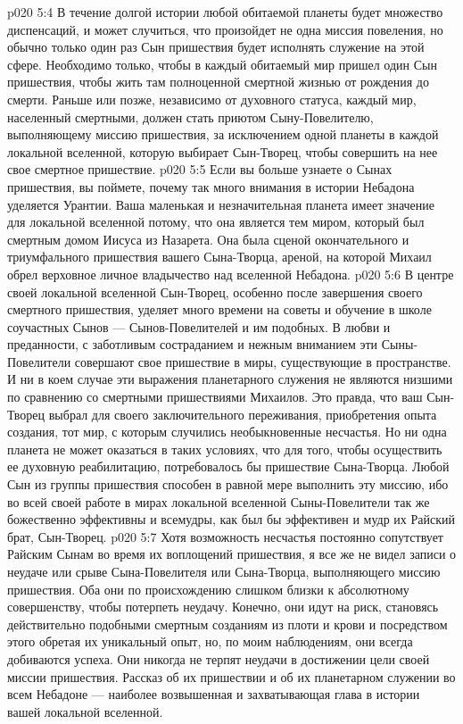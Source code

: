 \vs p020 5:4 В течение долгой истории любой обитаемой планеты будет множество диспенсаций, и может случиться, что произойдет не одна миссия повеления, но обычно только один раз Сын пришествия будет исполнять служение на этой сфере. Необходимо только, чтобы в каждый обитаемый мир пришел один Сын пришествия, чтобы жить там полноценной смертной жизнью от рождения до смерти. Раньше или позже, независимо от духовного статуса, каждый мир, населенный смертными, должен стать приютом Сыну\hyp{}Повелителю, выполняющему миссию пришествия, за исключением одной планеты в каждой локальной вселенной, которую выбирает Сын\hyp{}Творец, чтобы совершить на нее свое смертное пришествие.
\enlargethispage*{-\baselineskip}%
\vs p020 5:5 \pc Если вы больше узнаете о Сынах пришествия, вы поймете, почему так много внимания в истории Небадона уделяется Урантии. Ваша маленькая и незначительная планета имеет значение для локальной вселенной потому, что она является тем миром, который был смертным домом Иисуса из Назарета. Она была сценой окончательного и триумфального пришествия вашего Сына\hyp{}Творца, ареной, на которой Михаил обрел верховное личное владычество над вселенной Небадона.
\vs p020 5:6 В центре своей локальной вселенной Сын\hyp{}Творец, особенно после завершения своего смертного пришествия, уделяет много времени на советы и обучение в школе соучастных Сынов --- Сынов\hyp{}Повелителей и им подобных. В любви и преданности, с заботливым состраданием и нежным вниманием эти Сыны\hyp{}Повелители совершают свое пришествие в миры, существующие в пространстве. И ни в коем случае эти выражения планетарного служения не являются низшими по сравнению со смертными пришествиями Михаилов. Это правда, что ваш Сын\hyp{}Творец выбрал для своего заключительного переживания, приобретения опыта создания, тот мир, с которым случились необыкновенные несчастья. Но ни одна планета не может оказаться в таких условиях, что для того, чтобы осуществить ее духовную реабилитацию, потребовалось бы пришествие Сына\hyp{}Творца. Любой Сын из группы пришествия способен в равной мере выполнить эту миссию, ибо во всей своей работе в мирах локальной вселенной Сыны\hyp{}Повелители так же божественно эффективны и всемудры, как был бы эффективен и мудр их Райский брат, Сын\hyp{}Творец.
\vs p020 5:7 \pc Хотя возможность несчастья постоянно сопутствует Райским Сынам во время их воплощений пришествия, я все же не видел записи о неудаче или срыве Сына\hyp{}Повелителя или Сына\hyp{}Творца, выполняющего миссию пришествия. Оба они по происхождению слишком близки к абсолютному совершенству, чтобы потерпеть неудачу. Конечно, они идут на риск, становясь действительно подобными смертным созданиям из плоти и крови и посредством этого обретая их уникальный опыт, но, по моим наблюдениям, они всегда добиваются успеха. Они никогда не терпят неудачи в достижении цели своей миссии пришествия. Рассказ об их пришествии и об их планетарном служении во всем Небадоне --- наиболее возвышенная и захватывающая глава в истории вашей локальной вселенной.
